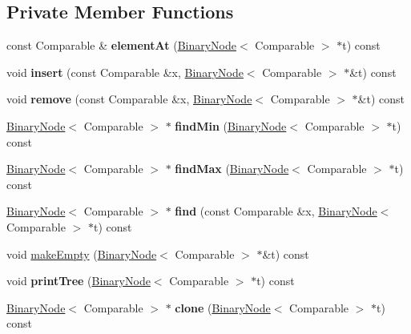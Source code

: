 \subsection*{Private Member Functions}
\begin{DoxyCompactItemize}
\item 
\mbox{\label{class_b_s_t_adb7d0e1197c30ff79cb0fb05fcd67249}} 
const Comparable \& {\bfseries element\+At} (\hyperlink{class_binary_node}{Binary\+Node}$<$ Comparable $>$ $\ast$t) const
\item 
\mbox{\label{class_b_s_t_a4d885d655c4a4e29c2d40f2b48baf7d3}} 
void {\bfseries insert} (const Comparable \&x, \hyperlink{class_binary_node}{Binary\+Node}$<$ Comparable $>$ $\ast$\&t) const
\item 
\mbox{\label{class_b_s_t_afe360f55921ac51ac78ddde6556fe946}} 
void {\bfseries remove} (const Comparable \&x, \hyperlink{class_binary_node}{Binary\+Node}$<$ Comparable $>$ $\ast$\&t) const
\item 
\mbox{\label{class_b_s_t_a1b79bb91ccef69398a80bf508a2a6097}} 
\hyperlink{class_binary_node}{Binary\+Node}$<$ Comparable $>$ $\ast$ {\bfseries find\+Min} (\hyperlink{class_binary_node}{Binary\+Node}$<$ Comparable $>$ $\ast$t) const
\item 
\mbox{\label{class_b_s_t_a922e4c2dfbd460db9e31531d8d20282b}} 
\hyperlink{class_binary_node}{Binary\+Node}$<$ Comparable $>$ $\ast$ {\bfseries find\+Max} (\hyperlink{class_binary_node}{Binary\+Node}$<$ Comparable $>$ $\ast$t) const
\item 
\mbox{\label{class_b_s_t_a858dd15e9d15affeb88785d0c5a65ae3}} 
\hyperlink{class_binary_node}{Binary\+Node}$<$ Comparable $>$ $\ast$ {\bfseries find} (const Comparable \&x, \hyperlink{class_binary_node}{Binary\+Node}$<$ Comparable $>$ $\ast$t) const
\item 
void \hyperlink{class_b_s_t_a5582f1066a084181d6a79ec0a6e9f9f2}{make\+Empty} (\hyperlink{class_binary_node}{Binary\+Node}$<$ Comparable $>$ $\ast$\&t) const
\item 
\mbox{\label{class_b_s_t_a76247d69325065d2485349148d7940e7}} 
void {\bfseries print\+Tree} (\hyperlink{class_binary_node}{Binary\+Node}$<$ Comparable $>$ $\ast$t) const
\item 
\mbox{\label{class_b_s_t_acefda5ede0b55cbb1f7deab580bd8fd9}} 
\hyperlink{class_binary_node}{Binary\+Node}$<$ Comparable $>$ $\ast$ {\bfseries clone} (\hyperlink{class_binary_node}{Binary\+Node}$<$ Comparable $>$ $\ast$t) const
\end{DoxyCompactItemize}
